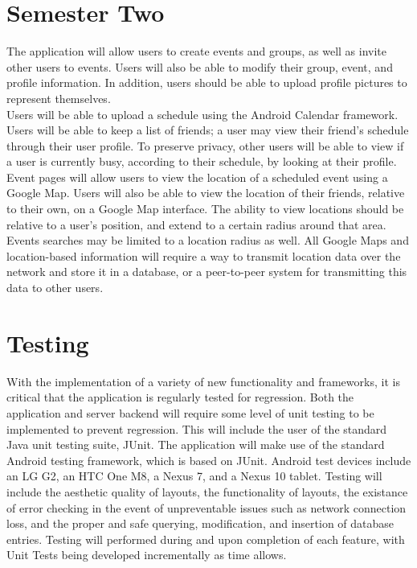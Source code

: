 \documentclass[11pt]{article}
\begin{document}
\section{Semester Two}
The application will allow users to create events and groups, as 
well as invite other users to events. Users will also be able to modify their group, event, and 
profile information. In addition, users should be able to upload profile pictures to represent 
themselves.\\

Users will be able to upload a schedule using the Android Calendar framework\cite{calendar}.
Users will be able to keep a list of friends; a user may view their friend's schedule through their 
user profile. To preserve privacy, other users will be able to view if a user is currently busy, 
according to their schedule, by looking at their profile.\\

Event pages will allow users to view the location of a scheduled event using a Google Map\cite{googlemaps}.
Users will also be able to view the location of their friends, relative to their own, on a 
Google Map\cite{googlemaps} interface. The ability to view locations should be relative to a user's 
position, and extend to a certain radius around that area. Events searches may be limited to a 
location radius as well. All Google Maps\cite{googlemaps} and location-based information will 
require a way to transmit location data over the network and store it in a database, or a 
peer-to-peer system for transmitting this data to other users\cite{location}.\\

\section{Testing}
With the implementation of a variety of new functionality and frameworks, it is critical that the
application is regularly tested for regression. Both the application and server backend will require 
some level of unit testing to be implemented to prevent regression. This will include the user of 
the standard Java unit testing suite, JUnit\cite{junit}. The application will make use of the 
standard Android testing framework, which is based on JUnit\cite{androidtest}. Android 
test devices include an LG G2, an HTC One M8, a Nexus 7, and a Nexus 10 tablet. 
Testing will include the aesthetic quality of layouts, the functionality of layouts,
the existance of error checking in the event of unpreventable issues such as 
network connection loss, and the proper and safe querying, modification, and insertion
of database entries. Testing will performed during and upon completion of each 
feature, with Unit Tests being developed incrementally as time allows.
\end{document}
